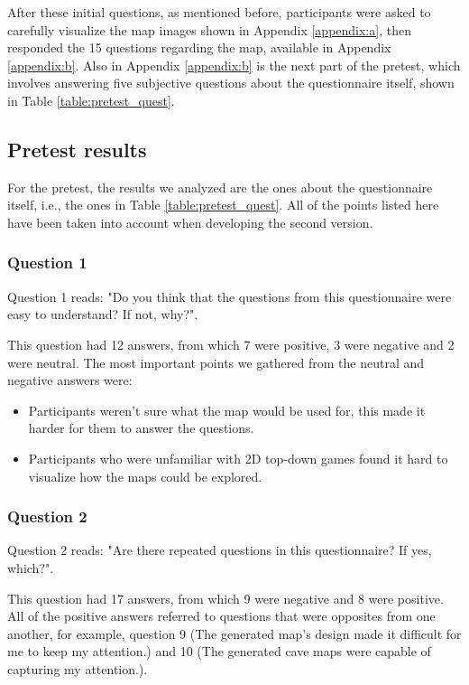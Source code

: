After these initial questions, as mentioned before, participants were asked to carefully visualize the map images shown in Appendix \ref{appendix:a}, then responded the 15 questions regarding the map, available in Appendix \ref{appendix:b}. Also in Appendix \ref{appendix:b} is the next part of the pretest, which involves answering five subjective questions about the questionnaire itself, shown in Table \ref{table:pretest_quest}.

\subsection{Pretest results}

For the pretest, the results we analyzed are the ones about the questionnaire itself, i.e., the ones in Table \ref{table:pretest_quest}. All of the points listed here have been taken into account when developing the second version.

\subsubsection{Question 1}

Question 1 reads: "Do you think that the questions from this questionnaire were easy to understand? If not, why?".

This question had 12 answers, from which 7 were positive, 3 were negative and 2 were neutral. The most important points we gathered from the neutral and negative answers were:

\begin{itemize}
    \item Participants weren't sure what the map would be used for, this made it harder for them to answer the questions.
    \item Participants who were unfamiliar with 2D top-down games found it hard to visualize how the maps could be explored.
\end{itemize}

\subsubsection{Question 2}

Question 2 reads: "Are there repeated questions in this questionnaire? If yes, which?".

This question had 17 answers, from which 9 were negative and 8 were positive. All of the positive answers referred to questions that were opposites from one another, for example, question 9 (The generated map’s design made it difficult for me to keep my attention.) and 10 (The generated cave maps were capable of capturing my attention.).

